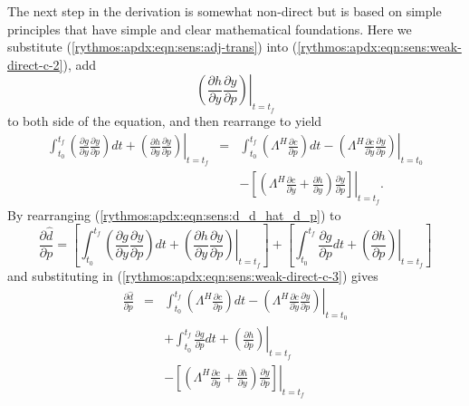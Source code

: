 \documentclass[pdf,ps2pdf,11pt]{SANDreport}
\begin{document}
The next step in the derivation is somewhat non-direct but is based on simple
principles that have simple and clear mathematical foundations.  Here we
substitute (\ref{rythmos:apdx:eqn:sens:adj-trans}) into
(\ref{rythmos:apdx:eqn:sens:weak-direct-c-2}), add
%
\[
\left. \left( \frac{\partial h}{\partial y} \frac{\partial y}{\partial p} \right) \right|_{t=t_f}
\]
%
to both side of the equation, and then rearrange to yield
%
\begin{eqnarray}
\int_{t_0}^{t_f} \left( \frac{\partial g}{\partial y} \frac{\partial y}{\partial p} \right) dt
+ \left. \left( \frac{\partial h}{\partial y} \frac{\partial y}{\partial p} \right) \right|_{t=t_f}
& = &  \int_{t_0}^{t_f} \left( \Lambda^H \frac{\partial c}{\partial p} \right) dt
- \left. \left( \Lambda^H \frac{\partial c}{\partial \dot{y}} \frac{\partial y}{\partial p} \right) \right|_{t=t_0}
\nonumber \\
& & - \left. \left[ \left(
    \Lambda^H \frac{\partial c}{\partial \dot{y}}
    +  \frac{\partial h}{\partial y}
  \right)  \frac{\partial y}{\partial p} \right] \right|_{t=t_f}.
\label{rythmos:apdx:eqn:sens:weak-direct-c-3}
\end{eqnarray}
%
By rearranging (\ref{rythmos:apdx:eqn:sens:d_d_hat_d_p}) to
%
\begin{equation}
\frac{\partial \hat{d}}{\partial p} 
= \left[
    \int_{t_0}^{t_f} \left(
      \frac{\partial g}{\partial y} \frac{\partial y}{\partial p} \right) dt
      + \left. \left( \frac{\partial h}{\partial y} \frac{\partial y}{\partial p} \right) \right|_{t=t_f}
  \right]
+ \left[
    \int_{t_0}^{t_f} \frac{\partial g}{\partial p} dt
    + \left. \left( \frac{\partial h}{\partial p} \right) \right|_{t=t_f}
  \right]
\label{rythmos:apdx:eqn:sens:d_d_hat_d_p-2}
\end{equation}
%
and substituting in (\ref{rythmos:apdx:eqn:sens:weak-direct-c-3}) gives
%
\begin{eqnarray}
\frac{\partial \hat{d}}{\partial p} 
& = & \int_{t_0}^{t_f} \left( \Lambda^H \frac{\partial c}{\partial p} \right) dt
- \left. \left( \Lambda^H \frac{\partial c}{\partial \dot{y}} \frac{\partial y}{\partial p} \right) \right|_{t=t_0}
\nonumber \\
& & + \int_{t_0}^{t_f} \frac{\partial g}{\partial p} dt
    + \left. \left( \frac{\partial h}{\partial p} \right) \right|_{t=t_f}
\nonumber \\
& & - \left. \left[ \left(
    \Lambda^H \frac{\partial c}{\partial \dot{y}}
    +  \frac{\partial h}{\partial y}
  \right)  \frac{\partial y}{\partial p} \right] \right|_{t=t_f}
\label{rythmos:apdx:eqn:sens:d_d_hat_d_p-3}
\end{eqnarray}
\end{document}
